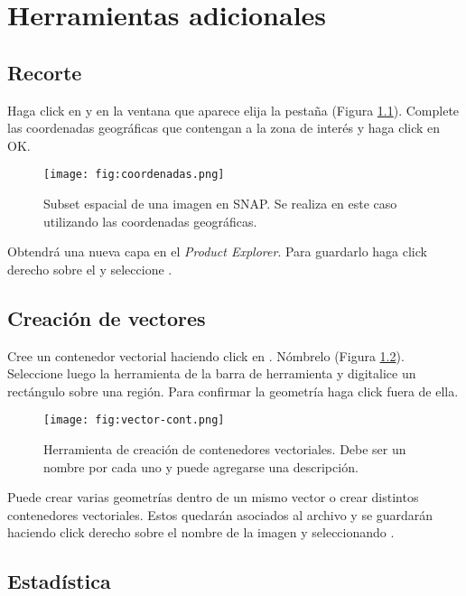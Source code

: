 \chapter{Herramientas adicionales}\label{ap:HA}

\section{Recorte}

Haga click en  y en la ventana que aparece elija la pestaña  (Figura \ref{fig:coordenadas}). Complete las coordenadas geográficas que contengan a la zona de interés y haga click en OK.

\begin{figure}[h!]
    \centering
    \texttt{[image: fig:coordenadas.png]}
    \caption{Subset espacial de una imagen en SNAP. Se realiza en este caso utilizando las coordenadas geográficas.}
    \label{fig:coordenadas}
\end{figure}

Obtendrá una nueva capa en el \emph{Product Explorer}. Para guardarlo haga click derecho sobre el y seleccione .

\section{Creación de vectores}

Cree un contenedor vectorial haciendo click en . Nómbrelo  (Figura \ref{fig:vector-cont}). Seleccione luego la herramienta  de la barra de herramienta y digitalice un rectángulo sobre una región. Para confirmar la geometría haga click fuera de ella.

\begin{figure}[h!]
    \centering
    \texttt{[image: fig:vector-cont.png]}
    \caption{Herramienta de creación de contenedores vectoriales. Debe ser un nombre por cada uno y puede agregarse una descripción.}
    \label{fig:vector-cont}
\end{figure}

Puede crear varias geometrías dentro de un mismo vector o crear distintos contenedores vectoriales. Estos quedarán asociados al archivo y se guardarán haciendo click derecho sobre el nombre de la imagen y seleccionando .

\section{Estadística}

